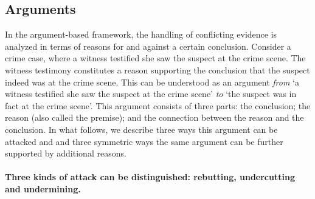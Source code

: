 \documentclass[10pt]{article}
\begin{document}


\subsection{Arguments}
\label{sec:confArg}


In the argument-based framework, the handling of conflicting evidence is analyzed 
in terms of reasons for and against a certain conclusion. Consider a crime case, where a witness testified she saw the 
suspect at the crime scene. The witness testimony constitutes a reason supporting the conclusion 
that the suspect indeed was at the crime scene. This can be understood as 
an argument \textit{from} `a witness testified she saw the suspect at the crime scene' \textit{to} 
`the suspect was in fact at the crime scene'.
This argument consists of three parts: the conclusion; the reason (also called the premise); and the connection between the reason and the conclusion.
In what follows, we describe three ways 
this argument can be attacked and and three symmetric 
ways the same argument can be further supported by additional reasons. 


\paragraph{Three kinds of attack can be distinguished: rebutting, undercutting and undermining.}
\end{document}

